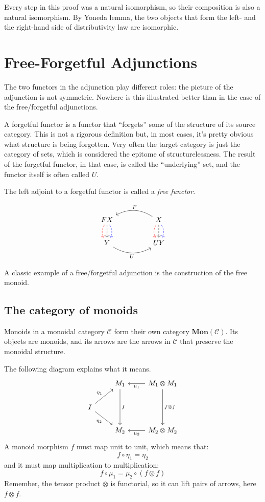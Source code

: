 \documentclass[DaoFP]{subfiles}
\begin{document}
Every step in this proof was a natural isomorphism, so their composition is also a natural isomorphism. By Yoneda lemma, the two objects that form the left- and the right-hand side of distributivity law are isomorphic.

\section{Free-Forgetful Adjunctions}
The two functors in the adjunction play different roles: the picture of the adjunction is not symmetric. Nowhere is this illustrated better than in the case of the free/forgetful adjunctions. 

A forgetful functor is a functor that ``forgets'' some of the structure of its source category. This is not a rigorous definition but, in most cases, it's pretty obvious what structure is being forgotten. Very often the target category is just the category of sets, which is considered the epitome of structurelessness. The result of the forgetful functor, in that case, is called the ``underlying'' set, and the functor itself is often called $U$. 

The left adjoint to a forgetful functor is called a \emph{free functor}.

\[
 \begin{tikzcd}
F X
\arrow[d, bend right, red, dashed]
\arrow[d, dashed]
\arrow[d, bend left, blue, dashed]
  &&
  X
\arrow[d, bend right, red, dashed]
\arrow[d, dashed]
\arrow[d, bend left, blue, dashed]
 \arrow[ll, bend right, "F"']
 \\
Y
   \arrow[rr, bend right, "U"']
 &&
 U Y
  \end{tikzcd}
\]

A classic example of a free/forgetful adjunction is the construction of the free monoid.


\subsection{The category of monoids}
Monoids in a monoidal category $\mathcal{C}$ form their own category $\mathbf{Mon}(\mathcal{C})$. Its objects are monoids, and its arrows are the arrows in $\mathcal{C}$ that preserve the monoidal structure. 

The following diagram explains what it means.
\[
 \begin{tikzcd}
 & M_1
 \arrow[dd, "f"]
 & M_1 \otimes M_1
 \arrow[l, "\mu_1"]
 \arrow[dd, "f \otimes f"]
 \\
 I
 \arrow[ru, "\eta_1"]
 \arrow[rd, "\eta_2"']
 \\
 & M_2
 & M_2 \otimes M_2
 \arrow[l, "\mu_2"]
  \end{tikzcd}
\]
A monoid morphism $f$ must map unit to unit, which means that:
\[ f \circ \eta_1 = \eta_2 \]
and it must map multiplication to multiplication:
\[ f \circ \mu_1 = \mu_2 \circ (f \otimes f)\]
Remember, the tensor product $\otimes$ is functorial, so it can lift pairs of arrows, here $f \otimes f$.
\end{document}
